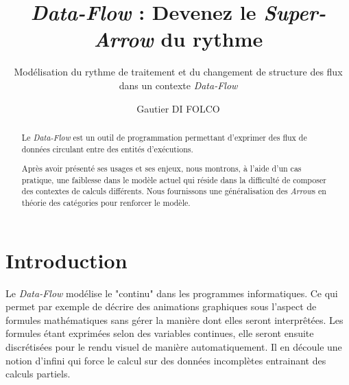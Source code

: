 \documentclass{llncs}
\newcommand{\DF}{\emph{Data-Flow} }
\newcommand{\SA}{\emph{Super-Arrow} }
\newcommand{\Arrs}{\emph{Arrow}s }
\begin{document}
\title{\DF : Devenez le \SA du rythme}


\subtitle{Modélisation du rythme de traitement et du changement de structure des flux dans un contexte \DF}


\author{Gautier DI FOLCO}







\maketitle

\begin{abstract}
Le \DF est un outil de programmation permettant d'exprimer des flux de
données circulant entre des entités d'exécutions.

Après avoir présenté ses usages et ses enjeux, nous montrons, à l'aide d'un
cas pratique, une faiblesse dans le modèle actuel qui réside dans la difficulté
de composer des contextes de calculs différents.
Nous fournissons une généralisation des \Arrs en théorie des catégories pour
renforcer le modèle.
\end{abstract}

\section{Introduction}
Le \DF modélise le "continu" dans les programmes informatiques.
Ce qui permet par exemple de décrire des animations graphiques sous l'aspect de
formules mathématiques sans gérer la manière dont elles seront interprêtées.
Les formules étant exprimées selon des variables continues, elle seront ensuite
discrétisées pour le rendu visuel de manière automatiquement.
Il en découle une notion d'infini qui force le calcul sur des données incomplètes
entrainant des calculs partiels.
\end{document}
